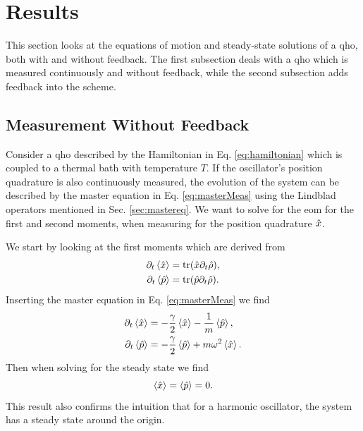 \section{Results}
This section looks at the equations of motion and steady-state solutions of a \gls{qho}, both with and without feedback. The first subsection deals with a \gls{qho} which is measured continuously and without feedback, while the second subsection adds feedback into the scheme.
\subsection{Measurement Without Feedback}
Consider a \gls{qho} described by the Hamiltonian in Eq. \eqref{eq:hamiltonian} which is coupled to a thermal bath with temperature $T$. If the oscillator's position quadrature is also continuously measured, the evolution of the system can be described by the master equation in Eq. \eqref{eq:masterMeas} using the Lindblad operators mentioned in Sec. \ref{sec:mastereq}. We want to solve for the \gls{eom} for the first and second moments, when measuring for the position quadrature $\hat{x}$. 

We start by looking at the first moments which are derived from
\begin{align}
    \partial_t\expval{\hat{x}} &= \tr(\hat{x} \partial_t \hat{\rho}),\\
    \partial_t\expval{\hat{p}} &= \tr(\hat{p} \partial_t \hat{\rho}).
\end{align}
Inserting the master equation in Eq. \eqref{eq:masterMeas} we find 
\begin{align}
    \partial_t\expval{\hat{x}} &= -\frac{\gamma}{2} \expval{\hat{x}} - \frac{1}{m} \expval{\hat{p}},\\
    \partial_t\expval{\hat{p}} &= -\frac{\gamma}{2} \expval{\hat{p}} + m\omega^2 \expval{\hat{x}}.
\end{align}
Then when solving for the steady state we find 
\begin{equation}
    \expval{\hat{x}} = \expval{\hat{p}} = 0. \label{eq:xp0}
\end{equation}
This result also confirms the intuition that for a harmonic oscillator, the system has a steady state around the origin. 

